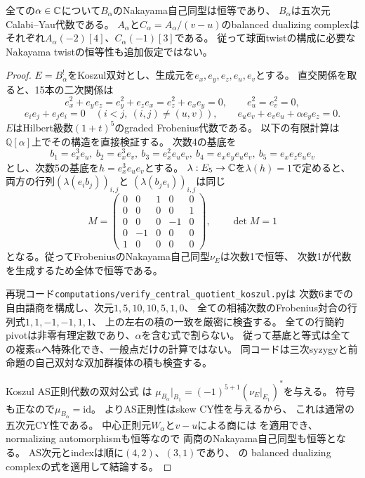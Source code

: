 \begin{proposition}
\label{prop:quotient-ambient-nakayama}
全ての$\alpha\in\mathbb C$について$B_\alpha$のNakayama自己同型は恒等であり、
$B_\alpha$は五次元Calabi--Yau代数である。
$A_\alpha$と$C_\alpha=A_\alpha/(v-u)$のbalanced dualizing complexは
それぞれ$A_\alpha(-2)[4]$、$C_\alpha(-1)[3]$である。
従って球面twistの構成に必要なNakayama twistの恒等性も追加仮定ではない。
\end{proposition}
\begin{proof}
$E=B_\alpha^!$をKoszul双対とし、生成元を$e_x,e_y,e_z,e_u,e_v$とする。
直交関係を取ると、15本の二次関係は
\[
 e_x^2+e_ye_z=e_y^2+e_ze_x=e_z^2+e_xe_y=0,
 \qquad e_u^2=e_v^2=0,
\]
\[
 e_ie_j+e_je_i=0\quad(i<j,\ (i,j)\ne(u,v)),\qquad
 e_ue_v+e_ve_u+\alpha e_ye_z=0.
\]
$E$はHilbert級数$(1+t)^5$のgraded Frobenius代数である。
以下の有限計算は$\mathbb Q[\alpha]$上でその構造を直接検証する。
次数4の基底を
\[
 b_1=e_x^3e_u,\ b_2=e_x^3e_v,\ b_3=e_x^2e_ue_v,\
 b_4=e_xe_ye_ue_v,\ b_5=e_xe_ze_ue_v
\]
とし、次数5の基底を$h=e_x^3e_ue_v$とする。
$\lambda:E_5\to\mathbb C$を$\lambda(h)=1$で定めると、
両方の行列$(\lambda(e_i b_j))_{i,j}$と
$(\lambda(b_j e_i))_{i,j}$は同じ
\[
 M=\begin{pmatrix}
 0&0&1&0&0\\
 0&0&0&0&1\\
 0&0&0&-1&0\\
 0&-1&0&0&0\\
 1&0&0&0&0
 \end{pmatrix},\qquad\det M=1
\]
となる。従ってFrobeniusのNakayama自己同型$\nu_E$は次数1で恒等、
次数1が代数を生成するため全体で恒等である。

再現コード\texttt{computations/verify\_central\_quotient\_koszul.py}は
次数6までの自由語商を構成し、次元$1,5,10,10,5,1,0$、
全ての相補次数のFrobenius対合の行列式$1,1,-1,-1,1,1$、
上の左右の積の一致を厳密に検査する。
全ての行簡約pivotは非零有理定数であり、$\alpha$を含む式で割らない。
従って基底と等式は全ての複素$\alpha$へ特殊化でき、一般点だけの計算ではない。
同コードは三次syzygyと前命題の自己双対な双加群複体の積も検査する。

Koszul AS正則代数の双対公式
\cite[proof of Theorem~6.3]{RRZNakayama}は
$\mu_{B_\alpha}|_{B_1}=(-1)^{5+1}(\nu_E|_{E_1})^*$を与える。
符号も正なので$\mu_{B_\alpha}=\mathrm{id}$。
\cite[Lemma~1.2]{RRZNakayama}よりAS正則性はskew CY性を与えるから、
これは通常の五次元CY性である。
中心正則元$W_\alpha$と$v-u$による商には
\cite[Lemma~1.5]{RRZNakayama}を適用でき、normalizing automorphismも恒等なので
両商のNakayama自己同型も恒等となる。
AS次元とindexは順に$(4,2)$、$(3,1)$であり、
\cite[Corollary~4.3 and its preceding discussion]{YZSerre}の
balanced dualizing complexの式を適用して結論する。
\end{proof}

